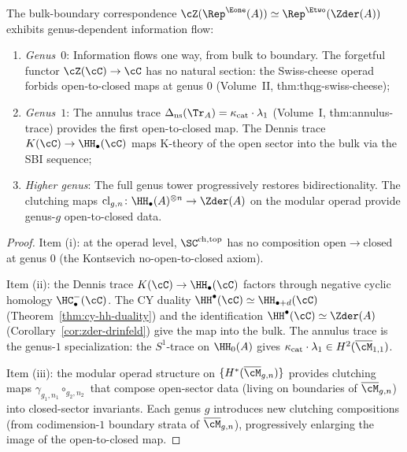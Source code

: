 \begin{proposition}
\label{prop:bulk-boundary-flow}
The bulk-boundary correspondence
$\cZ(\Rep^{\Eone}(A)) \simeq \Rep^{\Etwo}(\Zder(A))$ exhibits
genus-dependent information flow:
\begin{enumerate}[label=(\roman*)]
 \item \emph{Genus~$0$}: Information flows one way, from bulk to
 boundary. The forgetful functor
 $\cZ(\cC) \to \cC$ has no natural section: the Swiss-cheese
 operad forbids open-to-closed maps at genus $0$
 (Volume~II, thm:thqg-swiss-cheese);
 \item \emph{Genus~$1$}: The annulus trace
 $\Delta_{\mathrm{ns}}(\Tr_A) = \kappa_{\mathrm{cat}} \cdot \lambda_1$
 (Volume~I, thm:annulus-trace) provides the first open-to-closed
 map. The Dennis trace
 $K(\cC) \to \HH_\bullet(\cC)$ maps K-theory of the open sector
 into the bulk via the SBI sequence;
 \item \emph{Higher genus}: The full genus tower progressively
 restores bidirectionality. The clutching maps
 $\mathrm{cl}_{g,n} \colon \HH_\bullet(A)^{\otimes n} \to \Zder(A)$
 on the modular operad provide genus-$g$ open-to-closed data.
\end{enumerate}
\end{proposition}

\begin{proof}
Item (i): at the operad level, $\SC^{\mathrm{ch,top}}$ has no
composition $\mathrm{open} \to \mathrm{closed}$ at genus $0$
(the Kontsevich no-open-to-closed axiom).

Item (ii): the Dennis trace $K(\cC) \to \HH_\bullet(\cC)$ factors
through negative cyclic homology $\HC^-_\bullet(\cC)$. The CY
duality $\HH^\bullet(\cC) \simeq \HH_{\bullet+d}(\cC)$
(Theorem~\ref{thm:cy-hh-duality}) and the identification
$\HH^\bullet(\cC) \simeq \Zder(A)$ (Corollary~\ref{cor:zder-drinfeld})
give the map into the bulk. The annulus trace is the genus-$1$
specialization: the $S^1$-trace on $\HH_0(A)$ gives
$\kappa_{\mathrm{cat}} \cdot \lambda_1 \in H^2(\overline{\cM}_{1,1})$.

Item (iii): the modular operad structure on
$\{H^*(\overline{\cM}_{g,n})\}$ provides clutching maps
$\gamma_{g_1,n_1} \circ_{g_2,n_2}$ that compose open-sector data
(living on boundaries of $\overline{\cM}_{g,n}$) into closed-sector
invariants. Each genus $g$ introduces new clutching compositions
(from codimension-$1$ boundary strata of $\overline{\cM}_{g,n}$),
progressively enlarging the image of the open-to-closed map.
\end{proof}


